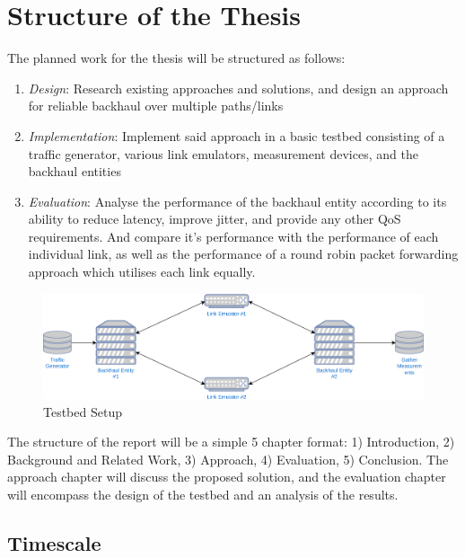 \section{Structure of the Thesis}
\label{sec:structure}

The planned work for the thesis will be structured as follows:

\begin{enumerate}
\item{\textit{Design}: Research existing approaches and solutions, and design an approach for reliable backhaul over multiple paths/links}
\item{\textit{Implementation}: Implement said approach in a basic testbed consisting of a traffic generator, various link emulators, measurement devices, and the backhaul entities}
\item{\textit{Evaluation}: Analyse the performance of the backhaul entity according to its ability to reduce latency, improve jitter, and provide any other QoS requirements. And compare it's performance with the performance of each individual link, as well as the performance of a round robin packet forwarding approach which utilises each link equally.}

\end{enumerate}

\begin{figure}[h]
    \centering
        \includegraphics[width=\textwidth]{fig/testbed.png}
        \caption{Testbed Setup}
        \label{fig:testbed}
\end{figure}

The structure of the report will be a simple 5 chapter format: 1) Introduction, 2) Background and Related Work, 3) Approach, 4) Evaluation, 5) Conclusion. The approach chapter will discuss the proposed solution, and the evaluation chapter will encompass the design of the testbed and an analysis of the results.

\subsection{Timescale}

